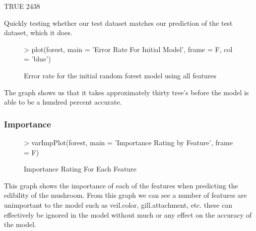 \documentclass[12pt]{article}         %
\begin{document}
\begin{Schunk}
\begin{Soutput}
TRUE 
2438 
\end{Soutput}
\end{Schunk}
\pagebreak
Quickly testing whether our test dataset matches our prediction of the test dataset, which it does.
\begin{figure}[H]
\begin{center}
\begin{Schunk}
\begin{Sinput}
> plot(forest, main = 'Error Rate For Initial Model', frame = F, col = 'blue')
\end{Sinput}
\end{Schunk}
\caption {Error rate for the initial random forest model using all features}
\label{fig4}
\end {center}
\end {figure}
The graph shows us that it takes approximately thirty tree's before the model is able to be a hundred percent accurate.

\pagebreak\subsubsection{Importance}
\begin{figure}[H]
\begin{center}
\begin{Schunk}
\begin{Sinput}
> varImpPlot(forest, main = 'Importance Rating by Feature', frame = F)
\end{Sinput}
\end{Schunk}
\caption {Importance Rating For Each Feature}
\label{fig5}
\end {center}
\end {figure}
This graph shows the importance of each of the features when predicting the edibility of the mushroom. From this graph we can see a number of features are unimportant to the model such as veil.color, gill.attachment, etc. these can effectively be ignored in the model without much or any effect on the accuracy of the model.
\end{document}
